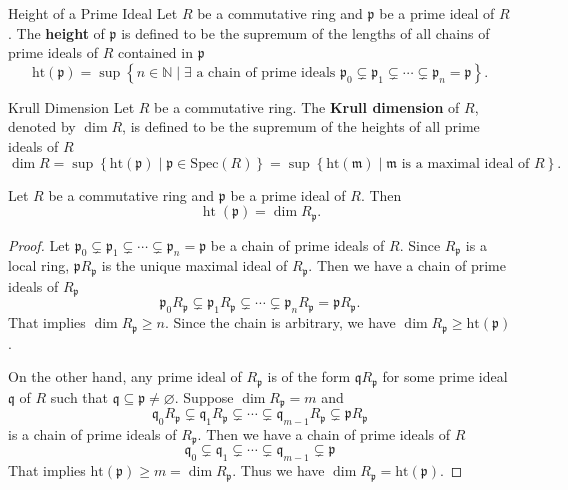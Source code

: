 \begin{definition}{Height of a Prime Ideal}{}
    Let $R$ be a commutative ring and $\mathfrak{p}$ be a prime ideal of $R$. The \textbf{height} of $\mathfrak{p}$ is defined to be the supremum of the lengths of all chains of prime ideals of $R$ contained in $\mathfrak{p}$
    \[
    \mathrm{ht}(\mathfrak{p})=\sup\left\{n\in\mathbb{N}\mid\exists\text{ a chain of prime ideals }\mathfrak{p}_0\subsetneq\mathfrak{p}_1\subsetneq\cdots\subsetneq\mathfrak{p}_n=\mathfrak{p}\right\}.
    \]
\end{definition}

\begin{definition}{Krull Dimension}{}
    Let $R$ be a commutative ring. The \textbf{Krull dimension} of $R$, denoted by $\dim R$, is defined to be the supremum of the heights of all prime ideals of $R$
    \[
    \dim R=\sup\left\{\mathrm{ht}(\mathfrak{p})\mid\mathfrak{p}\in \mathrm{Spec}(R)\right\}= \sup\left\{\mathrm{ht}(\mathfrak{m})\mid\mathfrak{m}\text{ is a maximal ideal of }R\right\}.
    \]
\end{definition}

\begin{proposition}{}{}
    Let $R$ be a commutative ring and $\mathfrak{p}$ be a prime ideal of $R$. Then 
    \[
    \operatorname{ht}\left(\mathfrak{p}\right) = \dim R_{\mathfrak{p}}.
    \]
\end{proposition}
\begin{proof}
    Let $\mathfrak{p}_0\subsetneq\mathfrak{p}_1\subsetneq\cdots\subsetneq\mathfrak{p}_n=\mathfrak{p}$ be a chain of prime ideals of $R$. Since $R_{\mathfrak{p}}$ is a local ring, $\mathfrak{p}R_{\mathfrak{p}}$ is the unique maximal ideal of $R_{\mathfrak{p}}$. Then we have a chain of prime ideals of $R_{\mathfrak{p}}$
    \[
    \mathfrak{p}_0R_{\mathfrak{p}}\subsetneq\mathfrak{p}_1R_{\mathfrak{p}}\subsetneq\cdots\subsetneq\mathfrak{p}_nR_{\mathfrak{p}}=\mathfrak{p}R_{\mathfrak{p}}.
    \]
     That implies $\dim R_{\mathfrak{p}}\geq n$. Since the chain is arbitrary, we have $\dim R_{\mathfrak{p}}\geq \mathrm{ht}(\mathfrak{p})$. 
    
    On the other hand, any prime ideal of $R_{\mathfrak{p}}$ is of the form $\mathfrak{q}R_{\mathfrak{p}}$ for some prime ideal $\mathfrak{q}$ of $R$ such that $\mathfrak{q}\subseteq\mathfrak{p}\ne \varnothing$. Suppose $\dim R_{\mathfrak{p}}=m$ and 
    \[
    \mathfrak{q}_0R_{\mathfrak{p}}\subsetneq\mathfrak{q}_1R_{\mathfrak{p}}\subsetneq\cdots\subsetneq\mathfrak{q}_{m-1}R_{\mathfrak{p}}\subsetneq\mathfrak{p}R_{\mathfrak{p}}
    \]
    is a chain of prime ideals of $R_{\mathfrak{p}}$. Then we have a chain of prime ideals of $R$
    \[
    \mathfrak{q}_0\subsetneq\mathfrak{q}_1\subsetneq\cdots\subsetneq\mathfrak{q}_{m-1}\subsetneq\mathfrak{p}
    \]
   That implies $\mathrm{ht}(\mathfrak{p})\geq m = \dim R_{\mathfrak{p}}$. Thus we have $\dim R_{\mathfrak{p}}= \mathrm{ht}(\mathfrak{p})$.
\end{proof}

